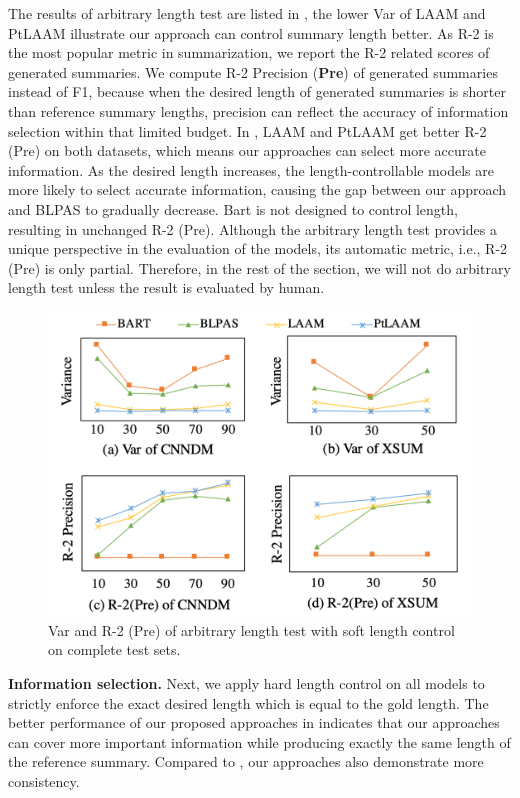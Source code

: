 The results of arbitrary length test are listed in ,
the lower Var of LAAM and PtLAAM illustrate our approach can control summary length better.
As R-2 is the most popular metric in summarization,
we report the R-2 related scores of generated summaries.
We compute R-2 Precision ({\bf Pre}) of generated summaries instead of F1, because 
when the desired length of generated summaries is shorter 
than reference summary lengths, precision can reflect the accuracy of 
information selection within that limited budget.
In , LAAM and PtLAAM get better R-2 (Pre) on both datasets, which means our approaches can select more accurate information. 
As the desired length increases, the length-controllable models are more likely to select accurate information,
causing the gap between our approach and BLPAS to gradually decrease.
Bart is not designed to control length, resulting in unchanged R-2 (Pre).
Although the arbitrary length test provides a unique perspective in
the evaluation of the models, its automatic metric, i.e., R-2 (Pre) is only partial.
Therefore, in the rest of the section, we will not do arbitrary length test
unless the result is evaluated by human.

\begin{figure}[!ht]
	\centering
	\scriptsize
	\includegraphics[width=0.95\linewidth]{freearbi.pdf}
	\caption{Var and R-2 (Pre) of arbitrary length test with soft length control on complete test sets.}
	\label{fig:freearbi}
\end{figure}

\textbf{Information selection.} 
Next, we apply hard length control on all models to strictly enforce the exact desired length which
is equal to the gold length.
The better performance of our proposed approaches in  indicates that our approaches can cover more important information while producing exactly the same length of the reference summary. 
Compared to , our approaches also demonstrate more consistency.

